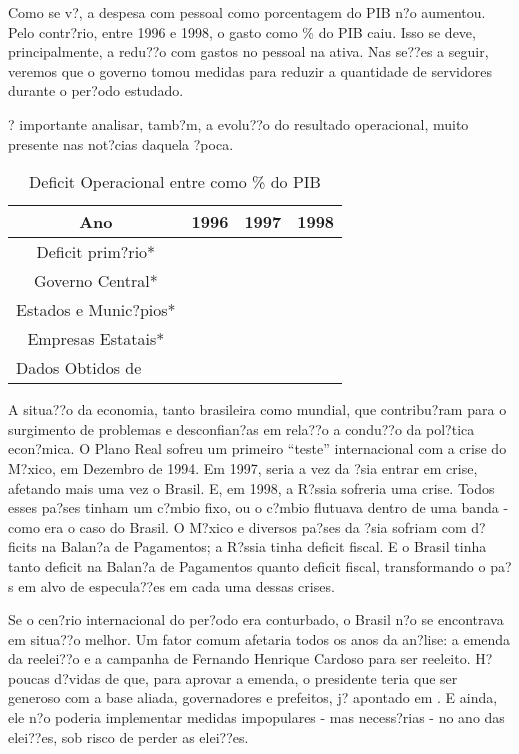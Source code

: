 \documentclass{article}
\begin{document}
Como se v?, a despesa com pessoal como porcentagem do PIB n?o aumentou. Pelo contr?rio, entre 1996 e 1998, o gasto como \% do PIB caiu. Isso se deve, principalmente, a redu??o com gastos no pessoal na ativa. Nas se??es a seguir, veremos que o governo tomou medidas para reduzir a quantidade de servidores durante o per?odo estudado.

? importante analisar, tamb?m, a evolu??o do resultado operacional, muito presente nas not?cias daquela ?poca. %

\begin{table}[h]
\begin{center}
\begin{tabular}[c]{|c|c|c|c|}
\hline
\textbf{Ano} & \textbf{1996} & \textbf{1997} & \textbf{1998}\\ \hline
Deficit prim?rio* &  &  &  \\ \hline
Governo Central* &  &  & \\ \hline
Estados e Munic?pios* &  &  &  \\ \hline
Empresas Estatais* &  &  &  \\ \hline
\multicolumn{4}{l}{Dados Obtidos de \citet{Giambiagi2002}} \\
\end{tabular}
\caption{Deficit Operacional entre como \% do PIB}
\end{center}
\end{table}

A situa??o da economia, tanto brasileira como mundial, que contribu?ram para o surgimento de problemas e desconfian?as em rela??o a condu??o da pol?tica econ?mica. O Plano Real sofreu um primeiro ``teste'' internacional com a crise do M?xico, em Dezembro de 1994. Em 1997, seria a vez da ?sia entrar em crise, afetando mais uma vez o Brasil. E, em 1998, a R?ssia sofreria uma crise. Todos esses pa?ses tinham um c?mbio fixo, ou o c?mbio flutuava dentro de uma banda - como era o caso do Brasil. O M?xico e diversos pa?ses da ?sia sofriam com d?ficits na Balan?a de Pagamentos; a R?ssia tinha deficit fiscal. E o Brasil tinha tanto deficit na Balan?a de Pagamentos quanto deficit fiscal, transformando o pa?s em alvo de especula??es em cada uma dessas crises. 

Se o cen?rio internacional do per?odo era conturbado, o Brasil n?o se encontrava em situa??o melhor. Um fator comum afetaria todos os anos da an?lise: a emenda da reelei??o e a campanha de Fernando Henrique Cardoso para ser reeleito. H? poucas d?vidas de que, para aprovar a emenda, o presidente teria que ser generoso com a base aliada, governadores e prefeitos, j? apontado em \citet{Werneck2014}. E ainda, ele n?o poderia implementar medidas impopulares - mas necess?rias -  no ano das elei??es, sob risco de perder as elei??es. 
\end{document}
